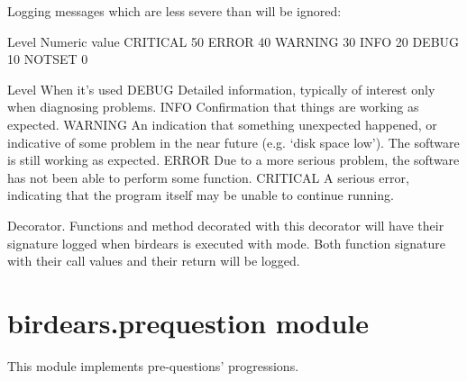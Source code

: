 \documentclass[letterpaper,10pt,english]{sphinxmanual}
\begin{document}
Logging messages which are less severe than  will be ignored:

\begin{sphinxVerbatim}[commandchars=\\\{\}]
Level       Numeric value
\PYGZhy{}\PYGZhy{}\PYGZhy{}\PYGZhy{}\PYGZhy{}       \PYGZhy{}\PYGZhy{}\PYGZhy{}\PYGZhy{}\PYGZhy{}\PYGZhy{}\PYGZhy{}\PYGZhy{}\PYGZhy{}\PYGZhy{}\PYGZhy{}\PYGZhy{}\PYGZhy{}
CRITICAL    50
ERROR       40
WARNING     30
INFO        20
DEBUG       10
NOTSET      0

Level       When it’s used
\PYGZhy{}\PYGZhy{}\PYGZhy{}\PYGZhy{}\PYGZhy{}       \PYGZhy{}\PYGZhy{}\PYGZhy{}\PYGZhy{}\PYGZhy{}\PYGZhy{}\PYGZhy{}\PYGZhy{}\PYGZhy{}\PYGZhy{}\PYGZhy{}\PYGZhy{}\PYGZhy{}\PYGZhy{}
DEBUG       Detailed information, typically of interest only when
                diagnosing problems.
INFO        Confirmation that things are working as expected.
WARNING     An indication that something unexpected happened, or indicative
                of some problem in the near future (e.g. ‘disk space low’).
                The software is still working as expected.
ERROR       Due to a more serious problem, the software has not been able
                to perform some function.
CRITICAL    A serious error, indicating that the program itself may be
                unable to continue running.
\end{sphinxVerbatim}

\begin{fulllineitems}
\label{\detokenize{index:birdears.logger.log_event}}
Decorator. Functions and method decorated with this decorator will have
their signature logged when birdears is executed with  mode. Both
function signature with their call values and their return will be logged.

\end{fulllineitems}



\section{birdears.prequestion module}
\label{\detokenize{index:module-birdears.prequestion}}\label{\detokenize{index:birdears-prequestion-module}}
This module implements pre-questions’ progressions.
\end{document}
